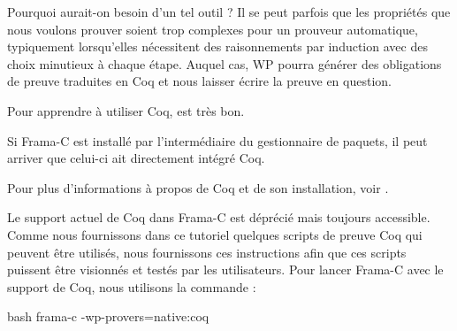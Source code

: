 Pourquoi aurait-on besoin d'un tel outil ? Il se peut parfois que les
propriétés que nous voulons prouver soient trop complexes pour un prouveur
automatique, typiquement lorsqu'elles nécessitent des raisonnements par
induction avec des choix minutieux à chaque étape. Auquel cas, WP pourra
générer des obligations de preuve traduites en Coq et nous laisser écrire
la preuve en question.



Pour apprendre à utiliser Coq,
est très bon.



\begin{Information}
Si Frama-C est installé par l'intermédiaire du gestionnaire de
paquets, il peut arriver que celui-ci ait directement intégré Coq.
\end{Information}


Pour plus d'informations à propos de Coq et de son installation, voir .


Le support actuel de Coq dans Frama-C est déprécié mais toujours
accessible. Comme nous fournissons dans ce tutoriel quelques scripts de preuve
Coq qui peuvent être utilisés, nous fournissons ces instructions afin que
ces scripts puissent être visionnés et testés par les utilisateurs. Pour lancer
Frama-C avec le support de Coq, nous utilisons la commande :


\begin{CodeBlock}{bash}
  frama-c -wp-provers=native:coq
\end{CodeBlock}
